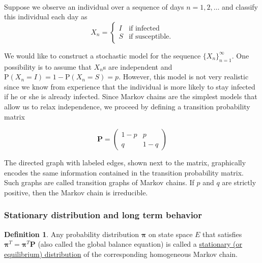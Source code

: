 \documentclass[11pt]{article}\usepackage[]{graphicx}\usepackage[]{color}
\numberwithin{algorithm}{section}
\theoremstyle{remark}
\theoremstyle{definition}
\newtheorem*{define}{Definition}
\newenvironment{example}[1]{\begin{trivlist}
\item[\hskip \labelsep {\bfseries Example}: \underline{#1}]\ \\}{\end{trivlist}}
\begin{document}
\begin{example}{SIS model}
Suppose we observe an individual over a sequence of days $n=1,2,\dots$ and classify this individual each
day as
\begin{equation*}
  X_n = \begin{cases}
    I &\text{if infected}\\
    S &\text{if susceptible}.
  \end{cases}
\end{equation*}
  \begin{center}

  \end{center}
We would like to construct a stochastic model for the sequence $\{X_n\}_{n=1}^{\infty}$. 
One possibility is to assume that $X_n$s are independent and
$\text{P}(X_n=I) = 1-\text{P}(X_n=S)=p$. However, this model is not very realistic
since we know from experience that the individual is more likely to stay infected if he or she
is already infected.  Since Markov chains are the simplest models that allow us to relax independence, 
we proceed by defining a transition probability matrix
\begin{minipage}[c]{0.5\textwidth}
  \begin{equation*}
    \mathbf{P} = \begin{pmatrix}
      1-p & p\\
      q & 1-q
    \end{pmatrix}
  \end{equation*}
\end{minipage}
\begin{minipage}[r]{0.4\textwidth}
\end{minipage}

The directed graph with labeled edges, shown next to the matrix, graphically encodes
the same information contained in the transition probability matrix. Such graphs are called 
transition graphs of Markov chains. If $p$ and $q$ are strictly positive, then the Markov chain
is irreducible.
\end{example}

\subsubsection{Stationary distribution and long term behavior}

\begin{define}
  Any probability distribution $\boldsymbol{\pi}$ on state space $E$ that
  satisfies $\boldsymbol{\pi}^T = \boldsymbol{\pi}^T\mathbf{P}$ (also called the global balance
  equation) is called a \underline{stationary (or equilibrium) distribution} of the
  corresponding homogeneous Markov chain.  
\end{define}
\end{document}
